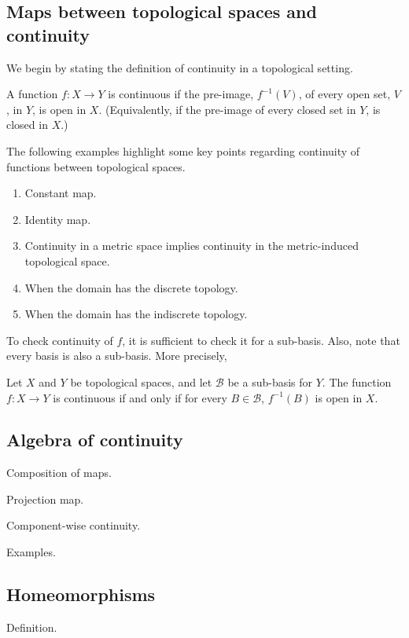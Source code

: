 \subsection{Maps between topological spaces and continuity}
We begin by stating the definition of continuity in a topological setting.
\begin{ndfn}
  A function $f : X \to Y$ is continuous if the pre-image, $f^{-1}(V)$, of every open set, $V$, in $Y$, is open in $X$. (Equivalently, if the pre-image of every closed set in $Y$, is closed in $X$.)
\end{ndfn}

\begin{negg}
  The following examples highlight some key points regarding continuity of functions between topological spaces.
  \begin{enumerate}
  \item Constant map.
  \item Identity map.
  \item Continuity in a metric space implies continuity in the metric-induced topological space.
  \item When the domain has the discrete topology.
  \item When the domain has the indiscrete topology.
  \end{enumerate}
\end{negg}

To check continuity of $f$, it is sufficient to check it for a sub-basis. Also, note that every basis is also a sub-basis. More precisely,
\begin{nlemma}
  Let $X$ and $Y$ be topological spaces, and let $\mathcal{B}$ be a sub-basis for $Y$. The function $f: X \to Y$ is continuous if and only if for every $B \in \mathcal{B}$, $f^{-1}(B)$ is open in $X$.
\end{nlemma}

\subsection{Algebra of continuity}
Composition of maps.

Projection map.

Component-wise continuity.

Examples.

\subsection{Homeomorphisms}
Definition.

